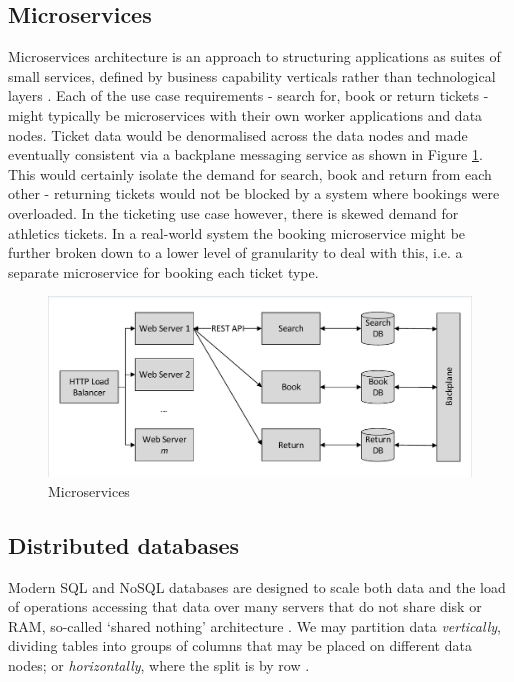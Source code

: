 \documentclass[runningheads]{llncs}
\begin{document}
%
%
\FloatBarrier
\subsection{Microservices}\label{sec:microservices}

Microservices architecture is an approach to structuring applications as suites of small services, defined by business capability verticals rather than technological layers \cite{RN1069,RN1070}.  Each of the use case requirements - search for, book or return tickets - might typically be microservices with their own worker applications and data nodes.  Ticket data would be denormalised across the data nodes and made eventually consistent via a backplane messaging service \cite{RN1071} as shown in Figure \ref{figure:microservices}.  This would certainly isolate the demand for search, book and return from each other - returning tickets would not be blocked by a system where bookings were overloaded.  In the ticketing use case however, there is skewed demand for athletics tickets.  In a real-world system the booking microservice might be further broken down to a lower level of granularity to deal with this, i.e. a separate microservice for booking each ticket type.

\begin{figure}
	\centering
	\includegraphics[trim = 5 5 5 5, clip, width=\textwidth]{img/microservices}
	\caption{Microservices}
	\label{figure:microservices}
\end{figure}

%
%
\FloatBarrier
\subsection{Distributed databases}\label{sec:distributed-databases}
Modern SQL and NoSQL databases are designed to scale both data and the load of operations accessing that data over many servers that do not share disk or RAM, so-called `shared nothing' architecture \cite{RN67}.  We may partition data {\itshape vertically}, dividing tables into groups of columns that may be placed on different data nodes; or {\itshape horizontally}, where the split is by row \cite{RN68}. 
\end{document}
